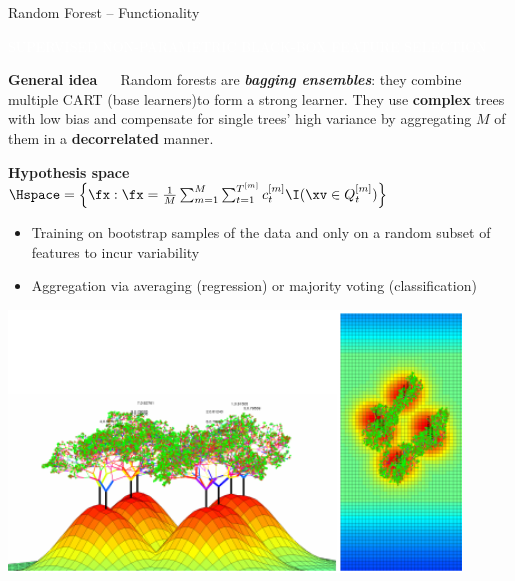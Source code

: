 \documentclass[11pt,compress,t,notes=noshow, xcolor=table]{beamer}
\newcommand{\maketag}[1]{\colorbox{highlightcol}{\textcolor{white}
{\MakeUppercase{#1}}}}
\newcommand{\highlight}[1]{\textcolor{highlightcol}{\textbf{#1}}}
\newcommand{\bfit}[1]{\textbf{\textit{#1}}}
\begin{document}
\begin{frame}{Random Forest -- Functionality}

\footnotesize

\maketag{SUPERVISED}
\maketag{NON-PARAMETRIC} 
\maketag{BLACK-BOX}
\maketag{FEATURE SELECTION}

\medskip

\highlight{General idea} ~~ Random forests are 
\bfit{bagging ensembles}: they combine multiple CART (base learners)to form a 
strong learner. They use \textbf{complex} trees with low  bias and compensate 
for single trees' high variance by aggregating $M$ of them in a 
\textbf{decorrelated} manner. 

\medskip

\highlight{Hypothesis space} ~~
$\Hspace = \left\{ \fx: \fx = \frac{1}{M} \sum_{m = 1}^M \sum_{t = 1}^{T^{[m]}} 
c_t^{[m]} \I(\xv \in Q_t^{[m]}) \right\}$

\medskip

\begin{minipage}{0.6\textwidth}
  \begin{itemize}
    \item Training on bootstrap samples of the data and only on a random subset 
    of features to incur variability
    \item Aggregation via averaging (regression) or majority voting
    (classification)
  \end{itemize}
\end{minipage}%
\begin{minipage}{0.4\textwidth}
  \includegraphics[width=0.9\textwidth]{figure/rf_3d.PNG}
\end{minipage}

\end{frame}

\end{document}
